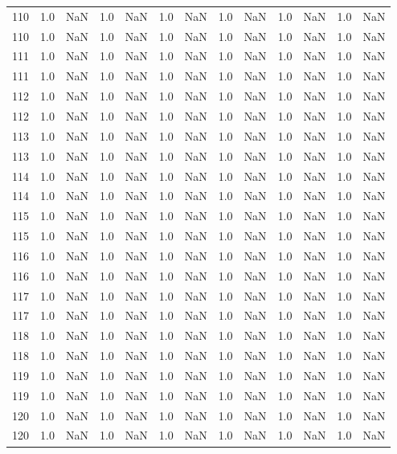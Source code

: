 \begin{tabular}{lrrrrrrrrrrrr}
110 & 1.0 & NaN & 1.0 & NaN & 1.0 & NaN & 1.0 & NaN & 1.0 & NaN & 1.0 & NaN \\
110 & 1.0 & NaN & 1.0 & NaN & 1.0 & NaN & 1.0 & NaN & 1.0 & NaN & 1.0 & NaN \\
111 & 1.0 & NaN & 1.0 & NaN & 1.0 & NaN & 1.0 & NaN & 1.0 & NaN & 1.0 & NaN \\
111 & 1.0 & NaN & 1.0 & NaN & 1.0 & NaN & 1.0 & NaN & 1.0 & NaN & 1.0 & NaN \\
112 & 1.0 & NaN & 1.0 & NaN & 1.0 & NaN & 1.0 & NaN & 1.0 & NaN & 1.0 & NaN \\
112 & 1.0 & NaN & 1.0 & NaN & 1.0 & NaN & 1.0 & NaN & 1.0 & NaN & 1.0 & NaN \\
113 & 1.0 & NaN & 1.0 & NaN & 1.0 & NaN & 1.0 & NaN & 1.0 & NaN & 1.0 & NaN \\
113 & 1.0 & NaN & 1.0 & NaN & 1.0 & NaN & 1.0 & NaN & 1.0 & NaN & 1.0 & NaN \\
114 & 1.0 & NaN & 1.0 & NaN & 1.0 & NaN & 1.0 & NaN & 1.0 & NaN & 1.0 & NaN \\
114 & 1.0 & NaN & 1.0 & NaN & 1.0 & NaN & 1.0 & NaN & 1.0 & NaN & 1.0 & NaN \\
115 & 1.0 & NaN & 1.0 & NaN & 1.0 & NaN & 1.0 & NaN & 1.0 & NaN & 1.0 & NaN \\
115 & 1.0 & NaN & 1.0 & NaN & 1.0 & NaN & 1.0 & NaN & 1.0 & NaN & 1.0 & NaN \\
116 & 1.0 & NaN & 1.0 & NaN & 1.0 & NaN & 1.0 & NaN & 1.0 & NaN & 1.0 & NaN \\
116 & 1.0 & NaN & 1.0 & NaN & 1.0 & NaN & 1.0 & NaN & 1.0 & NaN & 1.0 & NaN \\
117 & 1.0 & NaN & 1.0 & NaN & 1.0 & NaN & 1.0 & NaN & 1.0 & NaN & 1.0 & NaN \\
117 & 1.0 & NaN & 1.0 & NaN & 1.0 & NaN & 1.0 & NaN & 1.0 & NaN & 1.0 & NaN \\
118 & 1.0 & NaN & 1.0 & NaN & 1.0 & NaN & 1.0 & NaN & 1.0 & NaN & 1.0 & NaN \\
118 & 1.0 & NaN & 1.0 & NaN & 1.0 & NaN & 1.0 & NaN & 1.0 & NaN & 1.0 & NaN \\
119 & 1.0 & NaN & 1.0 & NaN & 1.0 & NaN & 1.0 & NaN & 1.0 & NaN & 1.0 & NaN \\
119 & 1.0 & NaN & 1.0 & NaN & 1.0 & NaN & 1.0 & NaN & 1.0 & NaN & 1.0 & NaN \\
120 & 1.0 & NaN & 1.0 & NaN & 1.0 & NaN & 1.0 & NaN & 1.0 & NaN & 1.0 & NaN \\
120 & 1.0 & NaN & 1.0 & NaN & 1.0 & NaN & 1.0 & NaN & 1.0 & NaN & 1.0 & NaN \\

\end{tabular}
